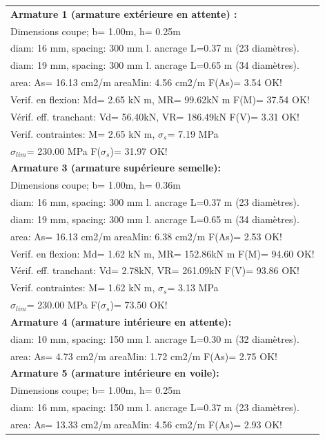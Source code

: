 \begin{center}
\begin{supertabular}[H]{|l|}
\hline
\textbf{Armature 1 (armature extérieure en attente) :} \\
  Dimensions coupe; b= 1.00m, h= 0.25m\\
  diam: 16 mm, spacing: 300 mm  l. ancrage L=0.37 m (23 diamètres).\\
  diam: 19 mm, spacing: 300 mm  l. ancrage L=0.65 m (34 diamètres).\\
  area: As=  16.13 cm2/m areaMin:   4.56 cm2/m  F(As)= 3.54 OK!\\
  Verif. en flexion: Md=   2.65 kN m, MR=  99.62kN m  F(M)= 37.54 OK!\\
  Vérif. eff. tranchant: Vd=  56.40kN,  VR= 186.49kN  F(V)= 3.31 OK!\\
  Verif. contraintes: M=   2.65 kN m, $\sigma_s$=   7.19 MPa\\
    $\sigma_{lim}$= 230.00 MPa  F($\sigma_s$)= 31.97 OK!\\
\textbf{Armature 3 (armature supérieure semelle):}\\
  Dimensions coupe; b= 1.00m, h= 0.36m\\
  diam: 16 mm, spacing: 300 mm  l. ancrage L=0.37 m (23 diamètres).\\
  diam: 19 mm, spacing: 300 mm  l. ancrage L=0.65 m (34 diamètres).\\
  area: As=  16.13 cm2/m areaMin:   6.38 cm2/m  F(As)= 2.53 OK!\\
  Verif. en flexion: Md=   1.62 kN m, MR= 152.86kN m  F(M)= 94.60 OK!\\
  Vérif. eff. tranchant: Vd=   2.78kN,  VR= 261.09kN  F(V)= 93.86 OK!\\
  Verif. contraintes: M=   1.62 kN m, $\sigma_s$=   3.13 MPa\\
    $\sigma_{lim}$= 230.00 MPa  F($\sigma_s$)= 73.50 OK!\\
\textbf{Armature 4 (armature intérieure en attente):}\\
  diam: 10 mm, spacing: 150 mm  l. ancrage L=0.30 m (32 diamètres).\\
  area: As=   4.73 cm2/m areaMin:   1.72 cm2/m  F(As)= 2.75 OK!\\
\textbf{Armature 5 (armature intérieure en voile):}\\
  Dimensions coupe; b= 1.00m, h= 0.25m\\
  diam: 16 mm, spacing: 150 mm  l. ancrage L=0.37 m (23 diamètres).\\
  area: As=  13.33 cm2/m areaMin:   4.56 cm2/m  F(As)= 2.93 OK!\\

\end{supertabular}
\end{center}
